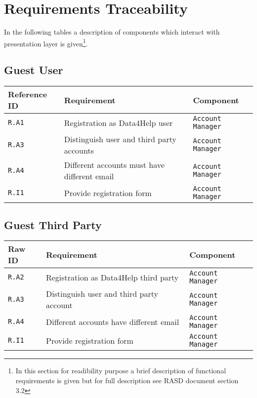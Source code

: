 \documentclass[../DD0.tex]{subfiles}
\begin{document}
\section{Requirements Traceability}
\label{sec:req}
In the following tables a description of components which interact with presentation layer is given\footnote{In this section for readibility purpose a brief description of functional requirements is given but for full description see RASD document section 3.2}.
\subsection{Guest User}

    \begin{table}[h!]

      \centering
      \begin{tabularx}{.8\linewidth}{|X|X|X|}
        \hline
        \textbf{Reference ID} & \textbf{Requirement} & \textbf{Component} \\ \hline
        \texttt{R.A1} & Registration as Data4Help user &\texttt{Account Manager} \\
        \hline
        \texttt{R.A3} & Distinguish user and third party accounts & \texttt{Account Manager} \\
        \hline
        \texttt{R.A4} & Different accounts must have different email & \texttt{Account Manager} \\
        \hline
        \texttt{R.I1} & Provide registration form  & \texttt{Account Manager} \\
        \hline
      \end{tabularx}
      \label{tab:guestuser}

    \end{table}


\subsection{Guest Third Party}

    \begin{table}[h!]

      \centering
      \begin{tabularx}{.8\linewidth}{|X|X|X|}
        \hline
        \textbf{Raw ID} & \textbf{Requirement} & \textbf{Component} \\ \hline
        \texttt{R.A2} & Registration as Data4Help third party &\texttt{Account Manager} \\
        \hline
        \texttt{R.A3} & Distinguish user and third party account & \texttt{Account Manager} \\
        \hline
        \texttt{R.A4} & Different accounts have different email & \texttt{Account Manager} \\
        \hline
        \texttt{R.I1} & Provide registration form & \texttt{Account Manager} \\
        \hline
       
      \end{tabularx}
      \label{tab:guesttp}

    \end{table}
\end{document}
